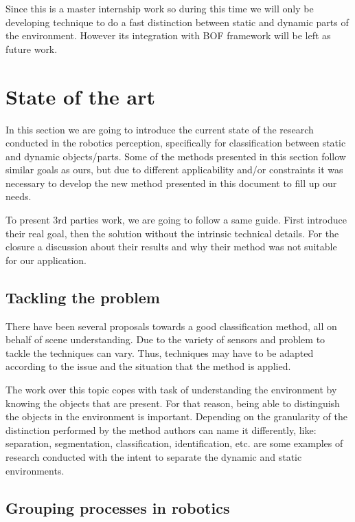Since this is a master internship work so during this time we will only be developing technique to do a fast distinction between static and dynamic parts of the environment. However its integration with BOF framework will be left as future work.

\section{State of the art}
In this section we are going to introduce the current state of the research conducted in the robotics perception, specifically for classification between static and dynamic objects/parts. Some of the methods presented in this section follow similar goals as ours, but due to different applicability and/or constraints it was necessary to develop the new method presented in this document to fill up our needs.

To present 3rd parties work, we are going to follow a same guide. First introduce their real goal, then the solution without the intrinsic technical details. For the closure a discussion about their results and why their method was not suitable for our application.

\subsection{Tackling the problem}

There have been several proposals towards a good classification method, all on behalf of scene understanding. Due to the variety of sensors and problem to tackle the techniques can vary. Thus, techniques may have to be adapted according to the issue and the situation that the method is applied.

The work over this topic copes with task of understanding the environment by knowing the objects that are present. For that reason, being able to distinguish the objects in the environment is important. Depending on the granularity of the distinction performed by the method authors can name it differently, like: separation, segmentation, classification, identification, etc. \cite{Wolf04onlinesimultaneous,DBLP:conf/iros/LidorisWB08} are some examples of research conducted with the intent to separate the dynamic and static environments.

\subsection{Grouping processes in robotics}


